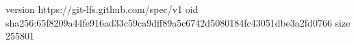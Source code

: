 version https://git-lfs.github.com/spec/v1
oid sha256:65f8209a44fe916ad33c59ca9dff89a5c6742d5080184fc43051dbe3a2fd0766
size 255801
